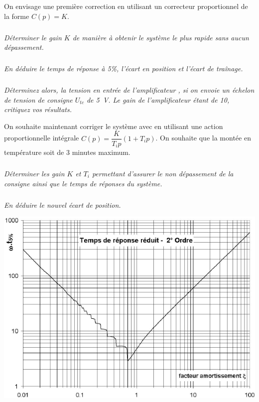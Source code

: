\documentclass[10pt,fleqn]{article} %
\begin{document}
\begin{multicols}{2}
On envisage une première correction en utilisant un correcteur proportionnel de la forme $C(p)=K$.


\subparagraph{}\textit{Déterminer le gain $K$ de manière à obtenir le système le plus rapide sans aucun dépassement.}


\subparagraph{}\textit{En déduire le temps de réponse à 5\%, l'écart en position et l'écart de traînage.}

\subparagraph{}\textit{Déterminez alors, la tension en entrée de l'amplificateur , si on envoie un échelon de tension de consigne $U_{tc}$ de \SI{5}{V}. Le gain de l'amplificateur étant de 10, critiquez vos résultats.}

On souhaite maintenant corriger le système avec en utilisant une action proportionnelle intégrale $C(p)=\dfrac{K}{T_i p}\left( 1+T_i p\right)$. On souhaite que la montée en température soit de 3 minutes maximum. 

\subparagraph{}\textit{Déterminer les gain $K$ et $T_i$ permettant d'assurer le non dépassement de la consigne ainsi que le temps de réponses du système.}


\subparagraph{}\textit{En déduire le nouvel écart de position.}

\begin{center}
\includegraphics[width=\linewidth]{images/fig_04}
\end{center}


\end{multicols}

%
\end{document}
